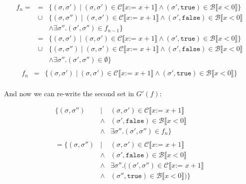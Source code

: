 \documentclass[10pt, oneside]{article}
\begin{document}
\begin{enumerate}[1.]
\begin{enumerate} [(a)]
      \begin{eqnarray*}
        f_n = & = & \{ (\sigma, \sigma') \mid (\sigma, \sigma') \in \mathcal{C} \llbracket x \texttt{:= } x + 1 \rrbracket \wedge (\sigma', \texttt{true}) \in \mathcal{B} \llbracket x < 0 \rrbracket \}  \\
        & \cup & \{ (\sigma, \sigma'') \mid (\sigma, \sigma')  \in \mathcal{C} \llbracket x \texttt{:= } x + 1 \rrbracket \wedge (\sigma', \texttt{false})\in \mathcal{B} \llbracket x < 0 \rrbracket \\
				& & \wedge \exists \sigma''. (\sigma', \sigma'') \in f_{n-1} \} \\
				& = & \{ (\sigma, \sigma') \mid (\sigma, \sigma') \in \mathcal{C} \llbracket x \texttt{:= } x + 1 \rrbracket \wedge (\sigma', \texttt{true}) \in \mathcal{B} \llbracket x < 0 \rrbracket \}  \\
        & \cup & \{ (\sigma, \sigma'') \mid (\sigma, \sigma')  \in \mathcal{C} \llbracket x \texttt{:= } x + 1 \rrbracket \wedge (\sigma', \texttt{false})\in \mathcal{B} \llbracket x < 0 \rrbracket \\
				& & \wedge \exists \sigma''. (\sigma', \sigma'') \in \emptyset \} \\
			\end{eqnarray*}
			\begin{eqnarray*}
				f_n & = & \{ (\sigma, \sigma') \mid (\sigma, \sigma') \in \mathcal{C} \llbracket x \texttt{:= } x + 1 \rrbracket \wedge (\sigma', \texttt{true}) \in \mathcal{B} \llbracket x < 0 \rrbracket \}  \\
			\end{eqnarray*}
			
			\pagebreak
			And now we can re-write the second set in $G'(f)$:
			
			\begin{eqnarray*}
			  \{ (\sigma, \sigma'') & \mid & (\sigma, \sigma')  \in \mathcal{C} \llbracket x \texttt{:= } x + 1 \rrbracket \\ 
			  & \wedge & (\sigma', \texttt{false})\in \mathcal{B} \llbracket x < 0 \rrbracket \\
				& \wedge & \exists \sigma''. (\sigma', \sigma'') \in f_n \} \\
				& & \\
				= \{ (\sigma, \sigma'') & \mid & (\sigma, \sigma')  \in \mathcal{C} \llbracket x \texttt{:= } x + 1 \rrbracket \\ 
			  & \wedge & (\sigma', \texttt{false})\in \mathcal{B} \llbracket x < 0 \rrbracket \\
				& \wedge & \exists \sigma''. ((\sigma', \sigma'') \in \mathcal{C} \llbracket x \texttt{:= } x + 1 \rrbracket \\
				& \wedge & (\sigma'', \texttt{true}) \in \mathcal{B} \llbracket x < 0 \rrbracket) \}
			\end{eqnarray*}
			

\end{enumerate}
\end{enumerate}
\end{document}
